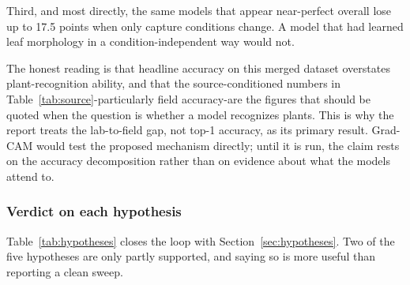 \documentclass[12pt,a4paper]{article}
\begin{document}
Third, and most directly, the same models that appear near-perfect overall lose up to 17.5 points when only capture conditions change. A model that had learned leaf morphology in a condition-independent way would not.

The honest reading is that headline accuracy on this merged dataset overstates plant-recognition ability, and that the source-conditioned numbers in Table~\ref{tab:source}-particularly field accuracy-are the figures that should be quoted when the question is whether a model recognizes plants. This is why the report treats the lab-to-field gap, not top-1 accuracy, as its primary result. Grad-CAM would test the proposed mechanism directly; until it is run, the claim rests on the accuracy decomposition rather than on evidence about what the models attend to.

\subsubsection{Verdict on each hypothesis}
Table~\ref{tab:hypotheses} closes the loop with Section~\ref{sec:hypotheses}. Two of the five hypotheses are only partly supported, and saying so is more useful than reporting a clean sweep.
\end{document}
